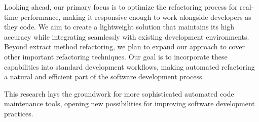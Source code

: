 Looking ahead, our primary focus is to optimize the refactoring process for real-time performance, making it responsive enough to work alongside developers as they code. We aim to create a lightweight solution that maintains its high accuracy while integrating seamlessly with existing development environments. Beyond extract method refactoring, we plan to expand our approach to cover other important refactoring techniques. Our goal is to incorporate these capabilities into standard development workflows, making automated refactoring a natural and efficient part of the software development process.

This research lays the groundwork for more sophisticated automated code maintenance tools, opening new possibilities for improving software development practices.